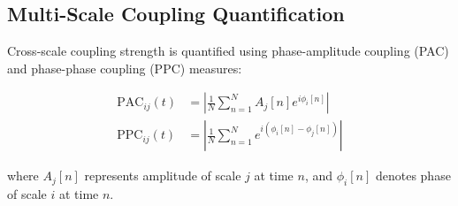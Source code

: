 \documentclass[12pt,a4paper]{article}
\theoremstyle{definition}
\begin{document}
\subsection{Multi-Scale Coupling Quantification}

Cross-scale coupling strength is quantified using phase-amplitude coupling (PAC) and phase-phase coupling (PPC) measures:

\begin{align}
\text{PAC}_{ij}(t) &= \left|\frac{1}{N} \sum_{n=1}^{N} A_j[n] e^{i\phi_i[n]}\right| \\
\text{PPC}_{ij}(t) &= \left|\frac{1}{N} \sum_{n=1}^{N} e^{i(\phi_i[n] - \phi_j[n])}\right|
\end{align}

where $A_j[n]$ represents amplitude of scale $j$ at time $n$, and $\phi_i[n]$ denotes phase of scale $i$ at time $n$.
\end{document}

